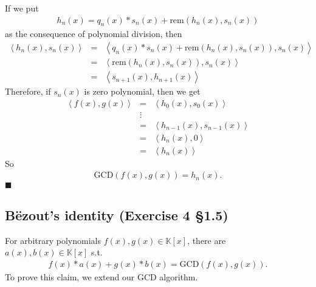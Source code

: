 \documentclass[11pt]{book}
\begin{document}
If we put
\begin{eqnarray}
h_n(x) = q_n(x)*s_n(x) + \text{rem}\left( h_n(x), s_n(x) \right)
\end{eqnarray}
as the consequence of polynomial division, then
\begin{eqnarray}
\left<h_n(x), s_n(x) \right>
&=& \left< q_n(x)*s_n(x) + \text{rem}\left( h_n(x), s_n(x) \right), s_n(x) \right> \qquad\\
&=& \left<\text{rem}\left( h_n(x), s_n(x) \right), s_n(x) \right> \\
&=& \left<s_{n+1}(x), h_{n+1}(x) \right>
\end{eqnarray}
Therefore, if $s_n(x)$ is zero polynomial, then we get
\begin{eqnarray}
\left<  f(x), g(x) \right>
&=& \left<h_0(x), s_0(x) \right> \\
\nonumber
&\vdots& \\
&=& \left<h_{n-1}(x), s_{n-1}(x) \right> \\
&=& \left<h_n(x), 0 \right> \\
&=& \left<h_n(x)\right>
\end{eqnarray}
So
\begin{eqnarray}
\text{GCD}\left( f(x), g(x) \right) = h_n(x).
\end{eqnarray}
$\blacksquare$

\subsection{B\"ezout's identity (Exercise 4 \S1.5)}
\label{BezoutLemma}
For arbitrary polynomials $f(x), g(x) \in \mathbb{K}[x]$, there are $a(x), b(x) \in \mathbb{K}[x]$ s.t.
\begin{eqnarray}
f(x) * a(x) + g(x) * b(x) = \text{GCD}\left( f(x), g(x) \right).
\end{eqnarray}
To prove this claim, we extend our GCD algorithm.
\end{document}
